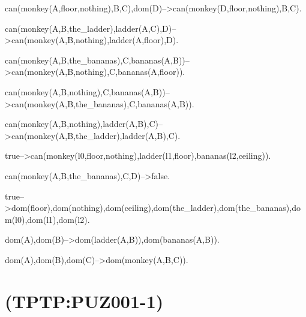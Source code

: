 can(monkey(A,floor,nothing),B,C),dom(D)-->can(monkey(D,floor,nothing),B,C).

can(monkey(A,B,the_ladder),ladder(A,C),D)-->can(monkey(A,B,nothing),ladder(A,floor),D).

can(monkey(A,B,the_bananas),C,bananas(A,B))-->can(monkey(A,B,nothing),C,bananas(A,floor)).

can(monkey(A,B,nothing),C,bananas(A,B))-->can(monkey(A,B,the_bananas),C,bananas(A,B)).

can(monkey(A,B,nothing),ladder(A,B),C)-->can(monkey(A,B,the_ladder),ladder(A,B),C).

true-->can(monkey(l0,floor,nothing),ladder(l1,floor),bananas(l2,ceiling)).

can(monkey(A,B,the_bananas),C,D)-->false.

true-->dom(floor),dom(nothing),dom(ceiling),dom(the_ladder),dom(the_bananas),dom(l0),dom(l1),dom(l2).

dom(A),dom(B)-->dom(ladder(A,B)),dom(bananas(A,B)).

dom(A),dom(B),dom(C)-->dom(monkey(A,B,C)).

\newline
\section{(TPTP:PUZ001-1)}



